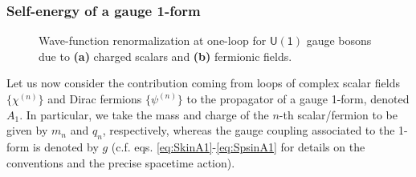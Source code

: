 \subsubsection{Self-energy of a gauge 1-form}
\label{sss:selfenergy1form}
%
\begin{figure}[t]
		\begin{center}
			\qquad \quad 
			\caption{Wave-function renormalization at one-loop for $\mathsf{U(1)}$ gauge bosons due to \textbf{(a)} charged scalars and \textbf{(b)} fermionic fields.}			
			\label{fig:1-formpropagator}
		\end{center}
\end{figure} 	
%
Let us now consider the contribution coming from loops of complex scalar fields $\{\chi^{(n)}\}$ and Dirac fermions $\{\psi^{(n)}\}$ to the propagator of a gauge 1-form, denoted $A_1$. In particular, we take the mass and charge of the $n$-th scalar/fermion to be given by $m_n$ and $q_n$, respectively, whereas the gauge coupling associated to the 1-form is denoted by $g$ (c.f. eqs. \eqref{eq:SkinA1}-\eqref{eq:SpsinA1} for details on the conventions and the precise spacetime action).
	
